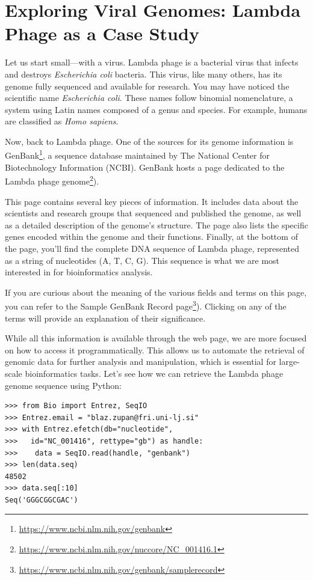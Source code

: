\section{Exploring Viral Genomes: Lambda Phage as a Case Study}

Let us start small—with a virus. Lambda phage is a bacterial virus that infects and destroys \textit{Escherichia coli} bacteria. This virus, like many others, has its genome fully sequenced and available for research. You may have noticed the scientific name \textit{Escherichia coli}. These names follow binomial nomenclature, a system using Latin names composed of a genus and species. For example, humans are classified as \textit{Homo sapiens}.

Now, back to Lambda phage. One of the sources for its genome information is GenBank\footnote{\url{https://www.ncbi.nlm.nih.gov/genbank}}, a sequence database maintained by The National Center for Biotechnology Information (NCBI). GenBank hosts a page dedicated to the Lambda phage genome\footnote{\url{https://www.ncbi.nlm.nih.gov/nuccore/NC_001416.1}}).

This page contains several key pieces of information. It includes data about the scientists and research groups that sequenced and published the genome, as well as a detailed description of the genome’s structure. The page also lists the specific genes encoded within the genome and their functions. Finally, at the bottom of the page, you'll find the complete DNA sequence of Lambda phage, represented as a string of nucleotides (A, T, C, G). This sequence is what we are most interested in for bioinformatics analysis.

If you are curious about the meaning of the various fields and terms on this page, you can refer to the Sample GenBank Record page\footnote{\url{https://www.ncbi.nlm.nih.gov/genbank/samplerecord}}). Clicking on any of the terms will provide an explanation of their significance.

While all this information is available through the web page, we are more focused on how to access it programmatically. This allows us to automate the retrieval of genomic data for further analysis and manipulation, which is essential for large-scale bioinformatics tasks. Let's see how we can retrieve the Lambda phage genome sequence using Python:

\vspace*{3mm}
\begin{lstlisting}
>>> from Bio import Entrez, SeqIO
>>> Entrez.email = "blaz.zupan@fri.uni-lj.si"
>>> with Entrez.efetch(db="nucleotide", 
>>>   id="NC_001416", rettype="gb") as handle:
>>>    data = SeqIO.read(handle, "genbank")
>>> len(data.seq)
48502
>>> data.seq[:10]
Seq('GGGCGGCGAC')
\end{lstlisting}

